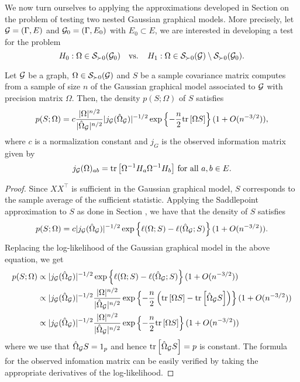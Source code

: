 
We now turn ourselves to applying the approximations developed in Section  on the problem of testing two nested Gaussian graphical models. More precisely, let ${\mathcal{G}} = (\Gamma, E)$ and ${\mathcal{G}}_0 = (\Gamma, E_0)$ with $E_0 \subset E$, we are interested in developing a test for the problem
\begin{equation} 
    H_0 : \Omega \in \S_{\succ 0}(\G_0)\ \ \t{ vs. }\ \ H_1 : \Omega \in \S_{\succ 0}(\G) \setminus \S_{\succ 0}(\G_0).
\end{equation}




\begin{lemma}
    \cite{eriksen1996tests} Let ${\mathcal{G}}$ be a graph, $\Omega \in {\mathcal{S}}_{\succ 0}({\mathcal{G}})$ and $S$ be a sample covariance matrix computes from a sample of size $n$ of the Gaussian graphical model associated to ${\mathcal{G}}$ with precision matrix $\Omega$. Then, the density $p(S; \Omega)$ of $S$ satisfies
    \begin{equation*}
        p(S; \Omega) = c \frac{|\Omega|^{n/2}}{|\hat\Omega_{\mathcal{G}}|^{n/2}} |j_{\mathcal{G}}(\hat\Omega_{\mathcal{G}}) |^{-1/2} \exp\left\{-\frac{n}{2} {\textrm{tr}\left[\Omega S\right]}\right\} (1 + O(n^{-3/2})),
    \end{equation*}
    where $c$ is a normalization constant and $j_G$ is the observed information matrix given by
    \begin{equation} \label{eq-obs-info}
        j_{\mathcal{G}}(\Omega)_{a b} = {\textrm{tr}\left[\Omega^{-1} H_a \Omega^{-1} H_b\right]} {\textrm{ for all }} a, b  \in E.
    \end{equation}
\end{lemma}

\begin{proof}
    Since $XX^\top$ is sufficient in the Gaussian graphical model, $S$ corresponds to the sample average of the sufficient statistic. Applying the Saddlepoint approximation to $S$ as done in Section , we have that the density of $S$ satisfies
    \begin{equation*}
        p(S; \Omega) = c |j_{\mathcal{G}}(\hat\Omega_{\mathcal{G}})|^{-1/2} \exp\left\{\ell(\Omega; S) - \ell(\hat\Omega_{\mathcal{G}}; S)\right\} (1 + O(n^{-3/2})).
    \end{equation*}
    Replacing the log-likelihood of the Gaussian graphical model in the above equation, we get
    \begin{align*}
        p(S; \Omega) 
        &\propto |j_{\mathcal{G}}(\hat\Omega_{\mathcal{G}})|^{-1/2} \exp\left\{\ell(\Omega; S) - \ell(\hat\Omega_{\mathcal{G}}; S)\right\} (1 + O(n^{-3/2})) \\
        &\propto |j_{\mathcal{G}}(\hat\Omega_{\mathcal{G}})|^{-1/2} 
        \frac{|\Omega|^{n/2}}{|\hat\Omega_{\mathcal{G}}|^{n/2}}
        \exp\left\{-\frac{n}{2}\left({\textrm{tr}\left[\Omega S\right]} - {\textrm{tr}\left[\hat\Omega_{\mathcal{G}} S\right]}\right)\right\} (1 + O(n^{-3/2}))\\
        &\propto |j_{\mathcal{G}}(\hat\Omega_{\mathcal{G}})|^{-1/2} 
        \frac{|\Omega|^{n/2}}{|\hat\Omega_{\mathcal{G}}|^{n/2}}
        \exp\left\{-\frac{n}{2}{\textrm{tr}\left[\Omega S\right]}\right\} (1 + O(n^{-3/2}))
    \end{align*}
    where we use that $\hat\Omega_{\mathcal{G}} S = 1_p$ and hence ${\textrm{tr}\left[\hat\Omega_{\mathcal{G}} S\right]} = p$ is constant. The formula for the observed infomation matrix can be easily verified by taking the appropriate derivatives of the log-likelihood.
\end{proof}

